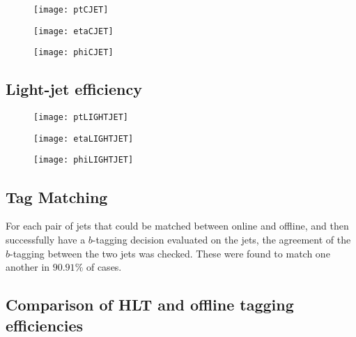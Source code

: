 		\begin{figure}[h]
			\centering
			\begin{minipage}[h]{0.31\linewidth}
				\texttt{[image: ptCJET]}

			\end{minipage}
			\quad
			\begin{minipage}[h]{0.31\linewidth}
				\texttt{[image: etaCJET]}
			\end{minipage}
			\quad
			\begin{minipage}[h]{0.31\linewidth}
				\texttt{[image: phiCJET]}
			\end{minipage}
			\caption{ }
			\label{fig:MC:cjetefficiency}
		\end{figure}

	\newpage
	\subsection{Light-jet efficiency}

		\begin{figure}[h]
			\centering
			\begin{minipage}[h]{0.31\linewidth}
				\texttt{[image: ptLIGHTJET]}

			\end{minipage}
			\quad
			\begin{minipage}[h]{0.31\linewidth}
				\texttt{[image: etaLIGHTJET]}
			\end{minipage}
			\quad
			\begin{minipage}[h]{0.31\linewidth}
				\texttt{[image: phiLIGHTJET]}
			\end{minipage}
			\caption{ }
			\label{fig:MC:lightjetefficiency}
		\end{figure}


	\subsection{Tag Matching}

	For each pair of jets that could be matched between online and offline, and then successfully have a $b$-tagging decision evaluated on the jets, the agreement of the $b$-tagging between the two jets was checked. These were found to match one another in $90.91\%$ of cases.

	\subsection{Comparison of HLT and offline tagging efficiencies}

